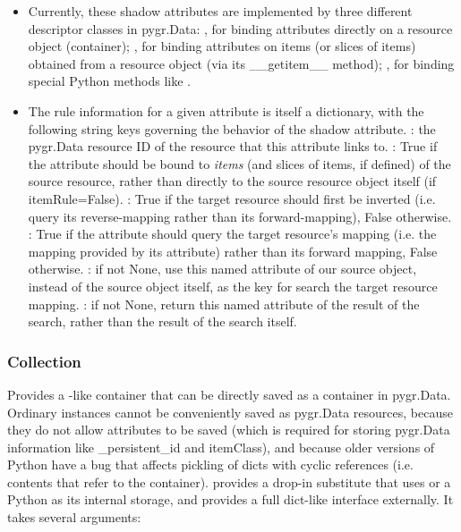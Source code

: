 \documentclass{howto}
\begin{document}
\begin{itemize}
\item Currently, these shadow attributes are implemented by
three different descriptor classes in pygr.Data: 
, for binding attributes directly on a resource
object (container);
 , for binding attributes on items (or slices of
items) obtained from a resource object (via its __getitem__ method);
, for binding special Python methods like
.

\item The rule information for a given attribute is itself a dictionary,
with the following string keys governing the behavior of the shadow attribute.
: the pygr.Data resource ID of the resource that this
attribute links to.
: True if the attribute should be bound to {\em items}
(and slices of items, if defined) of the source resource, rather than
directly to the source resource object itself (if itemRule=False).
: True if the target resource should first be inverted
(i.e. query its reverse-mapping rather than its forward-mapping), False otherwise.
: True if the attribute should query the target resource's
 mapping (i.e. the mapping provided by its  attribute)
rather than its forward mapping, False otherwise.
: if not None, use this named attribute of our source object,
instead of the source object itself, as the key for search the target resource
mapping.
: if not None, return this named attribute of the result of
the search, rather than the result of the search itself.
\end{itemize}

\subsubsection{Collection}
Provides a -like container that can be directly saved as a
container in pygr.Data.  Ordinary  instances cannot be 
conveniently saved as pygr.Data resources, because they do not allow
attributes to be saved (which is required for storing pygr.Data information
like _persistent_id and itemClass), and because older versions of Python
have a bug that affects pickling of dicts with cyclic references (i.e. contents
that refer to the container).   provides a drop-in
substitute that uses  or a Python  
as its internal storage, and provides
a full dict-like interface externally.  It takes several arguments:
\end{document}
